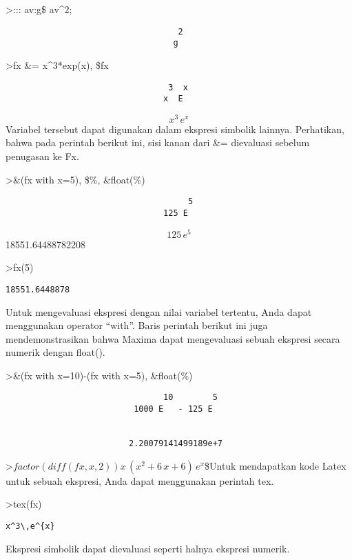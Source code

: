 \documentclass[
]{book}
\begin{document}
\textgreater::: av:g\$ av\^{}2;

\begin{verbatim}
                                   2
                                  g
\end{verbatim}

\textgreater fx \&= x\^{}3*exp(x), \$fx

\begin{verbatim}
                                 3  x
                                x  E
\end{verbatim}

\[x^3\,e^{x}\]Variabel tersebut dapat digunakan dalam ekspresi simbolik lainnya. Perhatikan, bahwa pada perintah berikut ini, sisi kanan dari \&= dievaluasi sebelum penugasan ke Fx.

\textgreater\&(fx with x=5), \$\%, \&float(\%)

\begin{verbatim}
                                     5
                                125 E
\end{verbatim}

\[125\,e^5\] 18551.64488782208

\textgreater fx(5)

\begin{verbatim}
18551.6448878
\end{verbatim}

Untuk mengevaluasi ekspresi dengan nilai variabel tertentu, Anda dapat menggunakan operator ``with''. Baris perintah berikut ini juga mendemonstrasikan bahwa Maxima dapat mengevaluasi sebuah ekspresi secara numerik dengan float().

\textgreater\&(fx with x=10)-(fx with x=5), \&float(\%)

\begin{verbatim}
                                10        5
                          1000 E   - 125 E


                         2.20079141499189e+7
\end{verbatim}

\textgreater{}\(factor(diff(fx,x,2))\)\(x\,\left(x^2+6\,x+6\right)\,e^{x}\)\$Untuk mendapatkan kode Latex untuk sebuah ekspresi, Anda dapat menggunakan perintah tex.

\textgreater tex(fx)

\begin{verbatim}
x^3\,e^{x}
\end{verbatim}

Ekspresi simbolik dapat dievaluasi seperti halnya ekspresi numerik.
\end{document}

